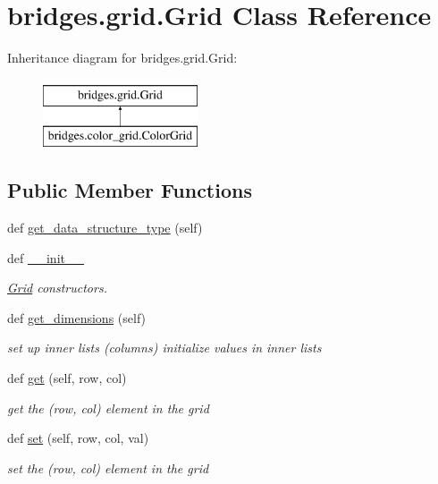 \hypertarget{classbridges_1_1grid_1_1_grid}{}\section{bridges.\+grid.\+Grid Class Reference}
\label{classbridges_1_1grid_1_1_grid}
Inheritance diagram for bridges.\+grid.\+Grid\+:\begin{figure}[H]
\begin{center}
\leavevmode
\includegraphics[height=2.000000cm]{classbridges_1_1grid_1_1_grid}
\end{center}
\end{figure}
\subsection*{Public Member Functions}
\begin{DoxyCompactItemize}
\item 
def \hyperlink{classbridges_1_1grid_1_1_grid_ab1a040a486bbad5259fec54fb885eac1}{get\+\_\+data\+\_\+structure\+\_\+type} (self)
\item 
def \hyperlink{classbridges_1_1grid_1_1_grid_a97c36cbe6f2f98a3a200a4ca1c116616}{\+\_\+\+\_\+init\+\_\+\+\_\+}
\begin{DoxyCompactList}\small\item\em \hyperlink{classbridges_1_1grid_1_1_grid}{Grid} constructors. \end{DoxyCompactList}\item 
def \hyperlink{classbridges_1_1grid_1_1_grid_a92ebe8a2155c2b1ba00a234c6965915d}{get\+\_\+dimensions} (self)
\begin{DoxyCompactList}\small\item\em set up inner lists (columns) initialize values in inner lists \end{DoxyCompactList}\item 
def \hyperlink{classbridges_1_1grid_1_1_grid_ac8e96eb04717ecd9ac23932af89e2d17}{get} (self, row, col)
\begin{DoxyCompactList}\small\item\em get the (row, col) element in the grid \end{DoxyCompactList}\item 
def \hyperlink{classbridges_1_1grid_1_1_grid_ae7ad05537d72c2fd13f41dc38ed8b90e}{set} (self, row, col, val)
\begin{DoxyCompactList}\small\item\em set the (row, col) element in the grid \end{DoxyCompactList}\end{DoxyCompactItemize}
